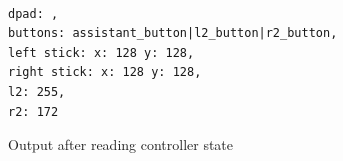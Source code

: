 % 
% 

\begin{code}
\begin{verbatim}

dpad: ,
buttons: assistant_button|l2_button|r2_button,
left stick: x: 128 y: 128,
right stick: x: 128 y: 128,
l2: 255,
r2: 172
\end{verbatim}
\caption{Output after reading controller state}
\label{code:wasi_controller_sample_output}
\end{code}

